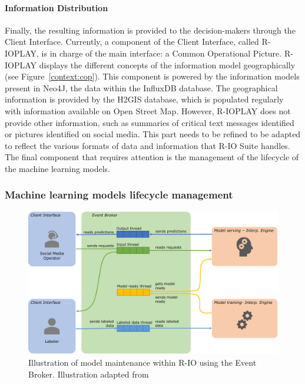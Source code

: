 \paragraph{Information Distribution}
Finally, the resulting information is provided to the decision-makers through the Client Interface.
Currently, a component of the Client Interface, called R-IOPLAY, is in charge of the main interface: a Common Operational Picture.
R-IOPLAY displays the different concepts of the information model geographically (see Figure~\ref{context:cop}).
This component is powered by the information models present in Neo4J, the data within the InfluxDB database.
The geographical information is provided by the H2GIS database, which is populated regularly with information available on Open Street Map.
However, R-IOPLAY does not provide other information, such as summaries of critical text messages identified or pictures identified on social media.
This part needs to be refined to be adapted to reflect the various formats of data and information that R-IO Suite handles.
The final component that requires attention is the management of the lifecycle of the machine learning models.

\subsubsection{Machine learning models lifecycle management}
\begin{figure}[htb]
    \centering
    \includegraphics[width=\textwidth]{figures/chap-5/rio-ml-lifecycle.pdf}
    \caption{Illustration of model maintenance within R-IO using the Event Broker. Illustration adapted from \textcite{burkovMachineLearningEngineering2020}}
    \label{system:rio-broker-ml-lifecycle}
\end{figure}

